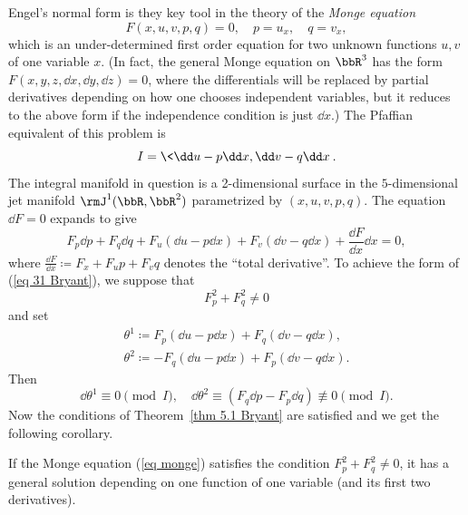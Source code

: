 Engel's normal form is they key tool in the theory of the \emph{Monge equation}
\[F(x,u,v,p,q)=0,\quad p=u_x,\quad q=v_x,\label{eq monge}\]
which is an under-determined first order equation for two unknown functions $u,v$ of one variable $x$. (In fact, the general Monge equation on $\bbR^3$ has the form $F(x,y,z,\dd x,\dd y,\dd z)=0$, where the differentials will be replaced by partial derivatives depending on how one chooses independent variables, but it reduces to the above form if the independence condition is just $\dd x$.) The Pfaffian equivalent of this problem is 
\[I=\<\dd u-p \dd x,\dd v-q\dd x\>.\]
The integral manifold in question is a 2-dimensional surface in the $5$-dimensional jet manifold $\rmJ^1(\bbR,\bbR^2)$ parametrized by $(x,u,v,p,q)$. The equation $\dd F=0$ expands to give 
\[F_{p}\dd p+F_q \dd q+F_u(\dd u-p\dd x)+F_v(\dd v-q\dd x)+\frac{\dd F}{\dd x}\dd x=0,\]
where $\frac{\dd F}{\dd x}\coloneqq F_x+F_u p+F_v q$ denotes the ``total derivative''. To achieve the form of (\ref{eq 31 Bryant}), we suppose that 
\[F^2_p +F^2_q\neq 0\]
and set 
\begin{align}
    \theta^1\coloneqq F_p(\dd u-p\dd x)+F_q(\dd v-q \dd x),\\
    \theta^2\coloneqq -F_q(\dd u-p\dd x)+F_p(\dd v-q\dd x).
\end{align}
Then 
\[\dd \theta^1\equiv 0 \pmod{I},\quad \dd\theta^2\equiv (F_q \dd p-F_p \dd q)\not\equiv 0\pmod{I}.\]
Now the conditions of Theorem~\ref{thm 5.1 Bryant} are satisfied and we get the following corollary.

\begin{cor}
    If the Monge equation (\ref{eq monge}) satisfies the condition $F_p^2+F_q^2\neq 0$, it has a general solution depending on one function of one variable (and its first two derivatives).
\end{cor}

